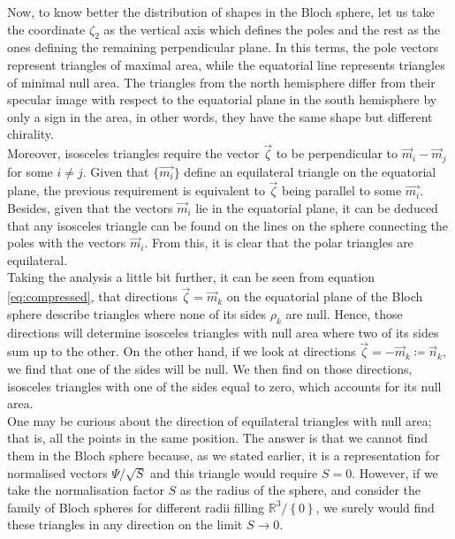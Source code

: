 Now, to know better the distribution of shapes in the Bloch sphere, let us take the coordinate $\zeta_2$ as the vertical axis which defines the poles and the rest as the ones defining the remaining perpendicular plane. In this terms, the pole vectors represent triangles of maximal area, while the equatorial line represents triangles of minimal null area. The triangles from the north hemisphere differ from their specular image with respect to the equatorial plane in the south hemisphere by only a sign in the area, in other words, they have the same shape but different chirality.\\

Moreover, isosceles triangles require the vector $\vec{\zeta}$ to be perpendicular to $\vec{m}_i-\vec{m}_j$ for some $i \neq j$. Given that $\{\vec{m_i}\}$ define an equilateral triangle on the equatorial plane, the previous requirement is equivalent to $\vec{\zeta}$ being parallel to some $\vec{m_i}$. Besides, given that the vectors $\vec{m}_i$ lie in the equatorial plane, it can be deduced that any isosceles triangle can be found on the lines on the sphere connecting the poles with the vectors $\vec{m}_i$. From this, it is clear that the polar triangles are equilateral.\\

Taking the analysis a little bit further, it can be seen from equation \eqref{eq:compressed}, that directions $\vec{\zeta} = \vec{m}_k$ on the equatorial plane of the Bloch sphere describe triangles where none of its sides $\rho_k$ are null. Hence, those directions will determine isosceles triangles with null area where two of its sides sum up to the other. On the other hand, if we look at directions $\vec{\zeta} = -\vec{m}_k \coloneqq \vec{n}_k$, we find that one of the sides will be null. We then find on those directions, isosceles triangles with one of the sides equal to zero, which accounts for its null area.\\

One may be curious about the direction of equilateral triangles with null area; that is, all the points in the same position.  The answer is that we cannot find them in the Bloch sphere because, as we stated earlier, it is a representation for normalised vectors $\Psi/\sqrt{S}$ and this triangle would require $S=0$. However, if we take the normalisation factor $S$ as the radius of the sphere, and consider the family of Bloch spheres for different radii filling $\mathbb{R}^3/\left\{0\right\}$, we surely would find these triangles in any direction on the limit $S\to 0$.\\

